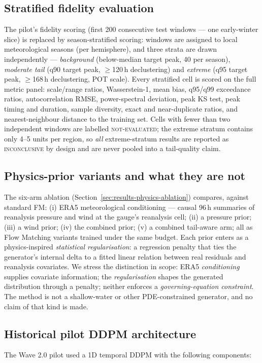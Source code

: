 \subsection{Stratified fidelity evaluation}
\label{subsec:stratified-fidelity}
The pilot's fidelity scoring (first 200 consecutive test windows --- one
early-winter slice) is replaced by season-stratified scoring: windows are
assigned to local meteorological seasons (per hemisphere), and three strata
are drawn independently --- \emph{background} (below-median target peak,
40 per season), \emph{moderate tail} (q90 target peak, $\ge$120\,h
declustering) and \emph{extreme} (q95 target peak, $\ge$168\,h declustering,
POT scale). Every stratified cell is scored on the full metric panel:
scale/range ratios, Wasserstein-1, mean bias, q95/q99 exceedance ratios,
autocorrelation RMSE, power-spectral deviation, peak KS test, peak timing
and duration, sample diversity, exact and near-duplicate ratios, and
nearest-neighbour distance to the training set. Cells with fewer than two
independent windows are labelled \textsc{not-evaluated}; the extreme stratum
contains only 4--5 units per region, so \emph{all} extreme-stratum results
are reported as \textsc{inconclusive} by design and are never pooled into a
tail-quality claim.

\subsection{Physics-prior variants and what they are not}
\label{subsec:physics-priors}
The six-arm ablation (Section~\ref{sec:results-physics-ablation}) compares,
against standard FM: (i) ERA5 meteorological conditioning --- causal 96\,h
summaries of reanalysis pressure and wind at the gauge's reanalysis cell;
(ii) a pressure prior; (iii) a wind prior; (iv) the combined prior;
(v) a combined tail-aware arm; all as Flow Matching variants trained under
the same budget. Each prior enters as a physics-inspired \emph{statistical
regularisation}: a regression penalty that ties the generator's internal
delta to a fitted linear relation between real residuals and reanalysis
covariates. We stress the distinction in scope: ERA5 \emph{conditioning}
supplies covariate information; the \emph{regularisation} shapes the
generated distribution through a penalty; neither enforces a
\emph{governing-equation constraint}. The method is not a shallow-water or
other PDE-constrained generator, and no claim of that kind is made.

\subsection{Historical pilot DDPM architecture}
\label{subsec:pilot-ddpm}
The Wave 2.0 pilot used a 1D temporal DDPM with the following components:

